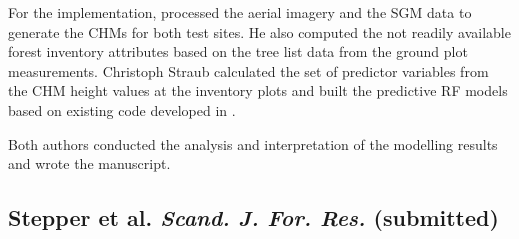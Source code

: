 \begin{description}
		For the implementation, 
		\myName processed the aerial imagery and the \ac{SGM} data to generate the \acp{CHM} for both test sites.
		He also computed the not readily available forest inventory attributes based on the tree list data
		from the ground plot measurements. Christoph Straub calculated the set of predictor variables
		from the \ac{CHM} height values at the inventory plots and built the predictive \ac{RF} models 
		based on existing code developed in \textcite{Stepper.2015b}. 
	
		Both authors conducted the analysis and interpretation of the modelling results and wrote the manuscript.
\end{description}



\subsection[Stepper et al. \emph{Scand. J. For. Res.} (submitted)]
{Stepper et al.\; 
	\emph{Scand. J. For. Res.}
	(submitted) }
\label{sec:pub.ScandJForRes2016}

